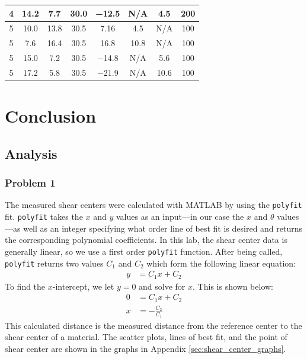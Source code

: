 \documentclass[12 pt]{report}
\begin{document}
\begin{table}[!htbp]
\begin{center}
\begin{tabular}{|c|c|c|c|c|c|c|c|}
		\hline
		\num{4}&\num{14.2}&\num{7.7}&\num{30.0}&\num{-12.5}&N/A&\num{4.5}&\num{200}\\
		\hline
		\num{5}&\num{10.0}&\num{13.8}&\num{30.5}&\num{7.16}&\num{4.5}&N/A&\num{100}\\
		\hline
		\num{5}&\num{7.6}&\num{16.4}&\num{30.5}&\num{16.8}&\num{10.8}&N/A&\num{100}\\
		\hline
		\num{5}&\num{15.0}&\num{7.2}&\num{30.5}&\num{-14.8}&N/A&\num{5.6}&\num{100}\\
		\hline
		\num{5}&\num{17.2}&\num{5.8}&\num{30.5}&\num{-21.9}&N/A&\num{10.6}&\num{100}\\
		\hline
	\end{tabular}
\end{center}
\label{tbl:data}
\end{table}

\chapter{Conclusion} \label{conclusion-chapter}
\section{Analysis} \label{analysis}
\subsection{Problem 1}
The measured shear centers were calculated with MATLAB by using the \texttt{polyfit} fit. \texttt{polyfit} takes the $x$ and $y$ values as an input---in our case the $x$ and $\theta$ values---as well as an integer specifying what order line of best fit is desired and returns the corresponding polynomial coefficients. In this lab, the shear center data is generally linear, so we use a first order \texttt{polyfit} function. After being called, \texttt{polyfit} returns two values $C_1$ and $C_2$ which form the following linear equation:
\begin{align*}
	y&=C_1x+C_2
\end{align*}
To find the $x$-intercept, we let $y=0$ and solve for $x$. This is shown below:
\begin{align*}
	0&=C_1x+C_2\\
	x&=-\frac{C_2}{C_1}
\end{align*}
This calculated distance is the measured distance from the reference center to the shear center of a material. The scatter plots, lines of best fit, and the point of shear center are shown in the graphs in Appendix \ref{sec:shear_center_graphs}.
\end{document}
